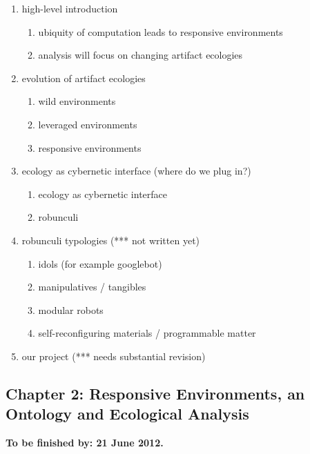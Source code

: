 \documentclass[12pt,letterpaper,notitlepage,onecolumn]{article}
\begin{document}
\begin{enumerate}
    \item high-level introduction
    \begin{enumerate}
        \item ubiquity of computation leads to responsive environments
        \item analysis will focus on changing artifact ecologies
    \end{enumerate}
    \item evolution of artifact ecologies
    \begin{enumerate}
        \item wild environments
        \item leveraged environments
        \item responsive environments
    \end{enumerate}
    \item ecology as cybernetic interface (where do we plug in?)
    \begin{enumerate}
        \item ecology as cybernetic interface
        \item robunculi
    \end{enumerate}
    \item robunculi typologies (*** not written yet)
    \begin{enumerate}
        \item idols (for example googlebot)
        \item manipulatives / tangibles
        \item modular robots
        \item self-reconfiguring materials / programmable matter
    \end{enumerate}
    \item our project (*** needs substantial revision)
\end{enumerate}

\subsection{Chapter 2: Responsive Environments, an Ontology and Ecological Analysis}
%
\textbf{To be finished by: 21 June 2012.}
\end{document}
